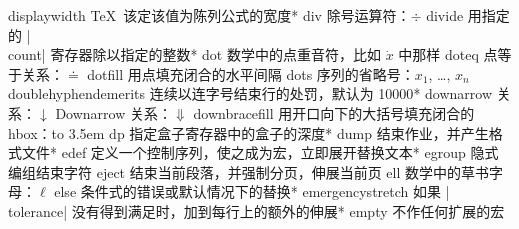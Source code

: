 \capcs displaywidth {\TeX\ 该定该值为陈列公式的宽度}*{}
\capcs div {除号运算符：$\div$}{}{}
\capcs divide {用指定的 |\\count| 寄存器除以指定的整数}*{}
\capcs dot {数学中的点重音符，比如 $\dot x$ 中那样}{}{}
\capcs doteq {点等于关系：$\doteq$}{}{}
\capcs dotfill {用点填充闭合的水平间隔}{}{}
\capcs dots {序列的省略号：$x_1$, \dots, $x_n$}{}{}
\capcs doublehyphendemerits {连续以连字号结束行的处罚，默认为 10000}*{}
\capcs downarrow {关系：$\downarrow$}{}{}
\capcs Downarrow {关系：$\Downarrow$}{}{}
\capcs downbracefill {用开口向下的大括号填充闭合的 hbox：\hbox to 3.5em{\downbracefill}}{}{}
\capcs dp {指定盒子寄存器中的盒子的深度}*{}
\capcs dump {结束作业，并产生格式文件}*{}
\capcs edef {定义一个控制序列，使之成为宏，立即展开替换文本}*{}
\capcs egroup {隐式编组结束字符}{}{}
\capcs eject {结束当前段落，并强制分页，伸展当前页}{}{}
\capcs ell {数学中的草书字母：$\ell$}{}{}
\capcs else {条件式的错误或默认情况下的替换}*{\@else}
\capcs emergencystretch {如果 |\\tol\-er\-ance| 没有得到满足时，加到每行上的额外的伸展}*{}
\capcs empty {不作任何扩展的宏}{}{}
